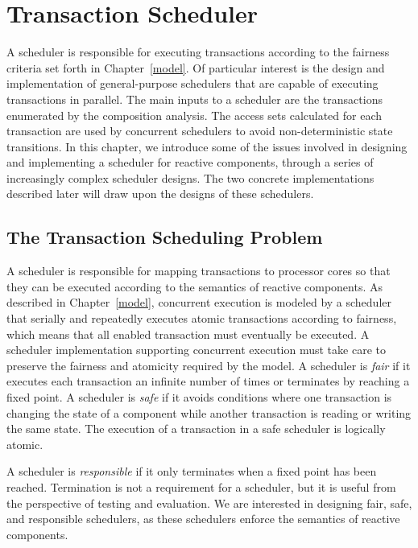 \chapter{Transaction Scheduler}
\label{scheduler}

A scheduler is responsible for executing transactions according to the fairness criteria set forth in Chapter~\ref{model}.
Of particular interest is the design and implementation of general-purpose schedulers that are capable of executing transactions in parallel.
The main inputs to a scheduler are the transactions enumerated by the composition analysis.
The access sets calculated for each transaction are used by concurrent schedulers to avoid non-deterministic state transitions.
In this chapter, we introduce some of the issues involved in designing and implementing a scheduler for reactive components, through a series of increasingly complex scheduler designs.
The two concrete implementations described later will draw upon the designs of these schedulers.

\section{The Transaction Scheduling Problem}
\label{scheduling_problem}

A scheduler is responsible for mapping transactions to processor cores so that they can be executed according to the semantics of reactive components.
As described in Chapter~\ref{model}, concurrent execution is modeled by a scheduler that serially and repeatedly executes atomic transactions according to fairness, which means that all enabled transaction must eventually be executed.
A scheduler implementation supporting concurrent execution must take care to preserve the fairness and atomicity required by the model.
A scheduler is \emph{fair} if it executes each transaction an infinite number of times or terminates by reaching a fixed point.
A scheduler is \emph{safe} if it avoids conditions where one transaction is changing the state of a component while another transaction is reading or writing the same state.
The execution of a transaction in a safe scheduler is logically atomic.

A scheduler is \emph{responsible} if it only terminates when a fixed point has been reached.
Termination is not a requirement for a scheduler, but it is useful from the perspective of testing and evaluation.
We are interested in designing fair, safe, and responsible schedulers, as these schedulers enforce the semantics of reactive components.

